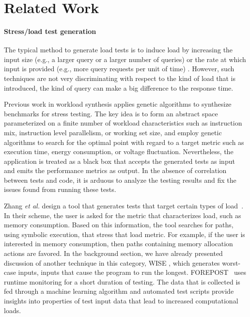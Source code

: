 \section{Related Work}\label{sec:related}


\paragraph{Stress/load test generation}

The typical method to generate load tests is to induce load by
increasing the input size (e.g., a larger query or a larger number of
queries) or the rate at which input is provided (e.g., more
query requests per unit of time) \cite{load-testing}. However, such techniques 
are not very discriminating with respect to the kind of load
that is introduced, \eg the kind of query can make a big difference
to the response time.

Previous work in workload synthesis \cite{joshi-hpca08, kim-micro12,
bodik-socc10} applies genetic algorithms to synthesize benchmarks for stress
testing. The key idea is to form an abstract space parameterized on a finite
number of workload characteristics such as instruction mix, instruction level
parallelism, or working set size, and employ genetic algorithms to search for
the optimal point with regard to a target metric such as execution time,
energy consumption, or voltage fluctuation. Nevertheless, the application is
treated as a black box that accepts the generated tests as input and emits the
performance metrics as output. In the absence of correlation between tests and code,
it is arduous to analyze the testing results and fix the issues found from
running these tests.

Zhang {\em et al.} design a tool that generates tests that target certain types of load~\cite{loadtests_zhang_ase11}. In their scheme, the user is asked for the metric that characterizes
load, such as memory consumption. Based on this information, the tool
searches for paths, using symbolic execution, that stress that
load metric. For example, if the user is
interested in memory consumption, then paths containing
memory allocation actions are favored. In the background section,
we have already presented discussion of another technique in this
category, WISE \cite{burnim-icse09}, which generates worst-case inputs,
\ie inputs that cause the program to run the longest. FOREPOST~\cite{loadinputs_grechanik_icse12} uses runtime monitoring for a short duration of testing. The data that is collected is fed through a machine learning algorithm and automated test scripts 
provide insights into properties of test input data that lead
to increased computational loads.   

